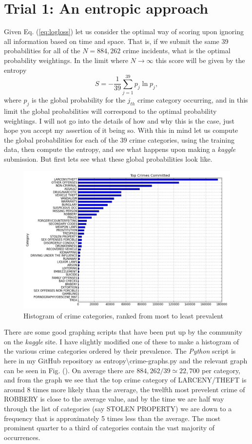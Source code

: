 \documentclass[12pt,notitlepage]{article}
\begin{document}
\section{Trial 1: An entropic approach}
Given Eq. (\ref{eq:logloss}) let us consider the optimal way of scoring upon ignoring all information based on time and space. That is, if we submit the same 39 probabilities for all of the $N=884,262$ crime incidents, what is the optimal probability weightings. In the limit where $N\rightarrow \infty$ this score will be given by the entropy
%
\begin{equation}
S = -\frac{1}{39}\sum_{j=1}^{39} p_j \ln{p_j},
\end{equation}
where $p_j$ is the global probability for the $j_{th}$ crime category occurring, and in this limit the global probabilities will correspond to the optimal probability weightings. I will not go into the details of how and why this is the case, just hope you accept my assertion of it being so. With this in mind let us compute the global probabilities for each of the 39 crime categories, using the training data, then compute the entropy, and see what happens upon making a \emph{kaggle} submission. But first lets see what these global probabilities look like.
%
\begin{figure}
\centering{}\includegraphics[scale=0.4]{crime-histo}\caption{ Histogram of crime categories, ranked from most to least prevalent \label{fig:crime-hist}}
\end{figure}
%
There are some good graphing scripts that have been put up by the community on the \emph{kaggle} site. I have slightly modified one of these to make a histogram of the various crime categories ordered by their prevalence. The \emph{Python} script is here in my GitHub repository as entropy\textbackslash crime-graphs.py and the relevant graph can be seen in Fig. (). On average there are $884,262 / 39 \simeq 22,700$ per category, and from the graph we see that the top crime category of LARCENY/THEFT is around 8 times more likely than the average, the twelfth most prevelent crime of ROBBERY is close to the average value, and by the time we are half way through the list of categories (say STOLEN PROPERTY) we are down to a frequency that is approximately 5 times less than the average. The most prominent quarter to a third of categories contain the vast majority of occurrences.  
\end{document}
